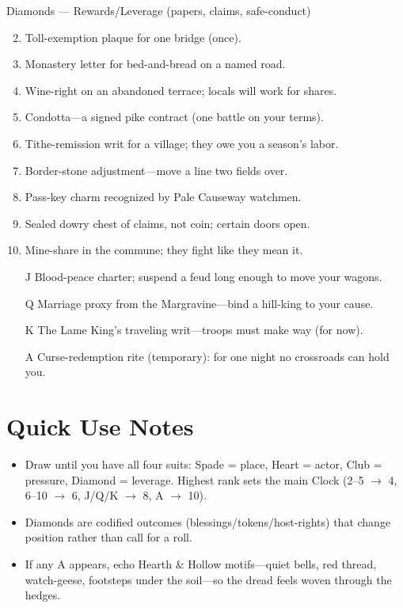 Diamonds --- Rewards/Leverage (papers, claims, safe-conduct)
\begin{enumerate}
\setcounter{enumi}{1}
\item Toll-exemption plaque for one bridge (once).
\item Monastery letter for bed-and-bread on a named road.
\item Wine-right on an abandoned terrace; locals will work for shares.
\item Condotta---a signed pike contract (one battle on your terms).
\item Tithe-remission writ for a village; they owe you a season's labor.
\item Border-stone adjustment---move a line two fields over.
\item Pass-key charm recognized by Pale Causeway watchmen.
\item Sealed dowry chest of claims, not coin; certain doors open.
\item Mine-share in the commune; they fight like they mean it.
\item[J] Blood-peace charter; suspend a feud long enough to move your wagons.
\item[Q] Marriage proxy from the Margravine---bind a hill-king to your cause.
\item[K] The Lame King's traveling writ---troops must make way (for now).
\item[A] Curse-redemption rite (temporary): for one night no crossroads can hold you.
\end{enumerate}

\section*{Quick Use Notes}
\begin{itemize}
\item Draw until you have all four suits: Spade = place, Heart = actor, Club = pressure, Diamond = leverage. Highest rank sets the main Clock (2--5 $\rightarrow$ 4, 6--10 $\rightarrow$ 6, J/Q/K $\rightarrow$ 8, A $\rightarrow$ 10).
\item Diamonds are codified outcomes (blessings/tokens/host-rights) that change position rather than call for a roll.
\item If any A appears, echo Hearth \& Hollow motifs---quiet bells, red thread, watch-geese, footsteps under the soil---so the dread feels woven through the hedges.
\end{itemize}

